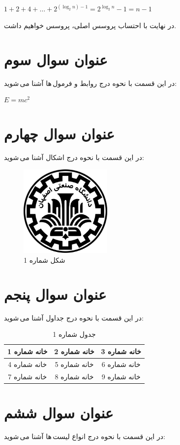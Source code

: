 \documentclass{article}
\begin{document}
\begin{center}
$
1+2+4+\ldots+2^{(\log_2 n)-1}=2^{\log_2 n}-1=n-1
$
\end{center}
در نهایت با احتساب پروسس  اصلی،  پروسس خواهیم داشت.

\section{عنوان سوال سوم}
در این قسمت با نحوه درج روابط و فرمول\,ها آشنا می\,شوید:
\begin{center}
$E = m{c}^{2}$
\end{center}

\section{عنوان سوال چهارم}
در این قسمت با نحوه درج اشکال آشنا می\,شوید:
\begin{figure}[ht]
    \centering
    \includegraphics[width=0.4\textwidth]{IUT Logo.png}
    \caption{شکل شماره 1}
    \label{fig:fig1}
\end{figure}

\section{عنوان سوال پنجم}
در این قسمت با نحوه درج جداول آشنا می\,شوید:
\begin{table}[ht]
    \centering
    \begin{tabular}{|c|c|c|}
    \hline
    خانه شماره 1 & خانه شماره 2 & خانه شماره 3\\
    \hline
    خانه شماره 4 & خانه شماره 5 & خانه شماره 6\\
    \hline
    خانه شماره 7 & خانه شماره 8 & خانه شماره 9\\
    \hline
    \end{tabular}
    \caption{جدول شماره 1}
    \label{tab:tab1}
\end{table}

\section{عنوان سوال ششم}
در این قسمت با نحوه درج انواع لیست\,ها آشنا می\,شوید:
\end{document}
